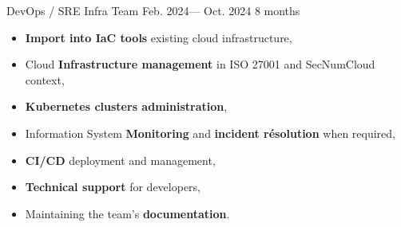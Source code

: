 \jobposition%
{DevOps / SRE}%
{Infra Team}%
{Feb. 2024--- Oct. 2024}%
{8 months}%
{
	\begin{itemize}
	  \item \textbf{Import into IaC tools} existing cloud infrastructure,
		\item Cloud \textbf{Infrastructure management} in ISO 27001 and SecNumCloud
		  context,
		\item \textbf{Kubernetes clusters administration},
		\item Information System \textbf{Monitoring} and \textbf{incident résolution}
		  when required,
		\item \textbf{CI/CD} deployment and management,
		\item \textbf{Technical support} for developers,
		\item Maintaining the team's \textbf{documentation}.
	\end{itemize}
}
